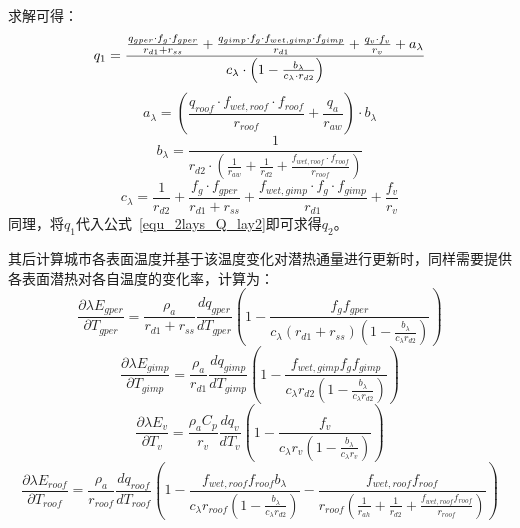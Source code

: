 求解可得：
\begin{equation}
    q_{1} = \\
    \frac{\frac{q_{gper} \cdot f_{g} \cdot f_{gper}}{r_{d1}+r_{ss}} + \frac{q_{gimp} \cdot f_{g} \cdot f_{wet,gimp} \cdot f_{gimp}}{r_{d1} } + \frac{q_{v} \cdot f_v}{r_{v}} + a_{\lambda}}{c_{\lambda} \cdot \left( 1 - \frac{b_{\lambda}}{c_{\lambda} \cdot r_{d2}}\right)}
\end{equation}
%
\begin{equation}
    a_{\lambda}= \left(\frac{q_{roof} \cdot f_{wet,roof} \cdot f_{roof}}{r_{roof}} + \frac{q_a}{r_{aw}}\right) \cdot b_{\lambda}
\end{equation}
%
\begin{equation}
    b_{\lambda} = \frac{1}{r_{d2} \cdot \left( \frac{1}{r_{aw}} + \frac{1}{r_{d2}} + \frac{f_{wet,roof} \cdot f_{roof}}{r_{roof}} \right)}
\end{equation}
%
\begin{equation}
    c_{\lambda} = \frac{1}{r_{d2}}+\frac{f_g \cdot f_{gper}}{r_{d1}+r_{ss}} + \frac{f_{wet,gimp} \cdot f_g \cdot f_{gimp}}{r_{d1}} + \frac{f_v}{r_{v}}
\end{equation}
同理，将$q_{1}$代入公式~\ref{equ_2lays_Q_lay2}即可求得$q_{2}$。

其后计算城市各表面温度并基于该温度变化对潜热通量进行更新时，同样需要提供各表面潜热对各自温度的变化率，计算为：
\begin{equation}
\frac{\partial \lambda E_{gper}}{\partial T_{gper}} = \frac{\rho _a}{r_{d1}+r_{ss}} \frac{dq_{gper}}{dT_{gper}} \left(1-\frac{f_{g}f_{gper}}{c_{\lambda} \left(r_{d1}+r_{ss}\right) \left(1-\frac{b_{\lambda}}{c_{\lambda} r_{d2}}\right)}\right)
\end{equation}
%
\begin{equation}
\frac{\partial \lambda E_{gimp}}{\partial T_{gimp}} = \frac{\rho _a}{r_{d1}} \frac{dq_{gimp}}{dT_{gimp}} \left(1-\frac{f_{wet,gimp} f_{g} f_{gimp}}{c_{\lambda} r_{d2}\left(1-\frac{b_{\lambda}}{c_{\lambda} r_{d2}}\right)}\right)
\end{equation}
%
\begin{equation}
\frac{\partial \lambda E_{v}}{\partial T_{v}} = \frac{\rho _a C_p}{r_{v}} \frac{dq_{v}}{dT_{v}} \left(1-\frac{f_{v}}{c_{\lambda} r_{v}\left(1-\frac{b_{\lambda}}{c_{\lambda} r_{v}}\right)}\right)
\end{equation}
%
\begin{equation}
\frac{\partial \lambda E_{roof}}{\partial T_{roof}} = \frac{\rho _a}{r_{roof}} \frac{dq_{roof}}{dT_{roof}} \left(1-\frac{f_{wet,roof}f_{roof} b_{\lambda}}{c_{\lambda} r_{roof} \left(1-\frac{b_{\lambda}}{c_{\lambda} r_{d2}}\right)}-\frac{f_{wet,roof}f_{roof}}{r_{roof}\left(\frac{1}{r_{ah}}+\frac{1}{r_{d2}}+\frac{f_{wet,roof} f_{roof}}{r_{roof}}\right)}\right)
\end{equation}


